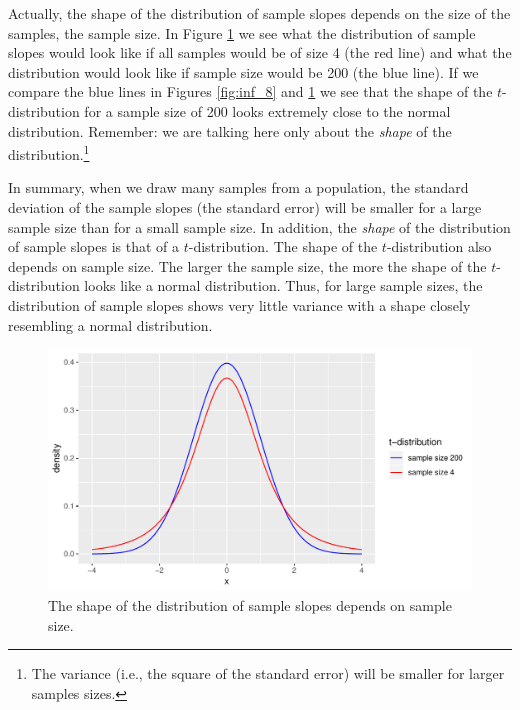 \documentclass[]{report}\usepackage[]{graphicx}\usepackage[]{color}
\makeatletter
\def\maxwidth{ %
  \ifdim\Gin@nat@width>\linewidth
    \linewidth
  \else
    \Gin@nat@width
  \fi
}
\newenvironment{knitrout}{}{} %
\makeatother
\begin{document}
Actually, the shape of the distribution of sample slopes depends on the size of the samples, the sample size. In Figure \ref{fig:inf_9} we see what the distribution of sample slopes would look like if all samples would be of size 4 (the red line) and what the distribution would look like if sample size would be 200 (the blue line). If we compare the blue lines in Figures \ref{fig:inf_8} and \ref{fig:inf_9} we see that the shape of the $t$-distribution for a sample size of 200 looks extremely close to the normal distribution. Remember: we are talking here only about the \textit{shape} of the distribution.\footnote{The variance (i.e., the square of the standard error) will be smaller for larger samples sizes.} 


In summary, when we draw many samples from a population, the standard deviation of the sample slopes (the standard error) will be smaller for a large sample size than for a small sample size. In addition, the \textit{shape} of the distribution of sample slopes is that of a $t$-distribution. The shape of the $t$-distribution also depends on sample size. The larger the sample size, the more the shape of the $t$-distribution looks like a normal distribution. Thus, for large sample sizes, the distribution of sample slopes shows very little variance with a shape closely resembling a normal distribution.


\begin{knitrout}
\color{fgcolor}\begin{figure}

{\centering \includegraphics[width=\maxwidth]{figure/inf_9-1} 

}

\caption[The shape of the distribution of sample slopes depends on sample size]{The shape of the distribution of sample slopes depends on sample size.}\label{fig:inf_9}
\end{figure}


\end{knitrout}
\end{document}

